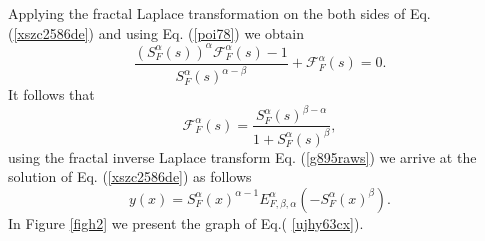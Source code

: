 \documentclass[12pt]{article}
\begin{document}
Applying the fractal Laplace transformation on the both sides of Eq. (\ref{xszc2586de}) and using  Eq. (\ref{poi78}) we obtain
\begin{equation}\label{b}
  \frac{(S_{F}^{\alpha}(s))^{ \alpha}\mathcal{F}_{F}^{\alpha}(s)-1 }{S_{F}^{\alpha}(s)^{\alpha-\beta}}+\mathcal{F}_{F}^{\alpha}(s)=0.
\end{equation}
It follows that
\begin{equation}\label{xzs}
 \mathcal{F}_{F}^{\alpha}(s)=\frac{S_{F}^{\alpha}(s)^{\beta-\alpha}}{1+S_{F}^{\alpha}(s)^{\beta}},
\end{equation}
using the fractal inverse Laplace transform Eq. (\ref{g895raws}) we arrive at the solution of Eq. (\ref{xszc2586de}) as follows
\begin{equation}\label{ujhy63cx}
 y(x)=S_{F}^{\alpha}(x)^{\alpha-1}E^{\alpha}_{F,\beta,\alpha}\left(-S_{F}^{\alpha}(x)^{\beta}\right).
\end{equation}
In Figure \ref{figh2} we present the graph of Eq.( \ref{ujhy63cx}).\\
\end{document}
